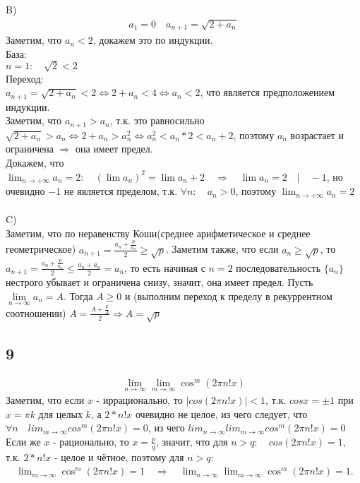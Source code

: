 		\\ \\
		B)\\
		\begin{gather*}
		a_1 = 0 \quad a_{n+1} = \sqrt{2 + a_n}
		\end{gather*}
		Заметим, что $a_n < 2$, докажем это по индукции. \\
		База:\\
		$n = 1: \quad \sqrt{2} < 2$\\ 
		Переход:\\
		$a_{n+1} = \sqrt{2 + a_n} < 2 \Longleftrightarrow 2 + a_n < 4 \Longleftrightarrow a_n < 2$, что является предположением индукции.\\
		Заметим, что $a_{n+1} > a_n$, т.к. это равносильно $\sqrt{2 + a_n} > a_n \Longleftrightarrow 2 + a_n > a_n^2 \Longleftrightarrow a_n^2 < a_n*2 < a_n + 2$, поэтому $a_n$ возрастает и ограничена $\Longrightarrow$ она имеет предел. \\
		Докажем, что $\lim_{n\to+\infty} a_n = 2: \quad (\lim a_n)^2= \lim a_n + 2 \quad \Longrightarrow \quad \lim a_n = 2 \quad|\quad -1$, но очевидно $-1$ не является пределом, т.к. $\forall n:\quad a_n > 0$, поэтому $\lim_{n\to+\infty} a_n = 2$
		\\ \\
		C)\\
		Заметим, что по неравенству Коши(среднее арифметическое и среднее геометрическое) $a_{n+1} = \frac{a_{n} + \frac{p}{a_{n}}}{2} \geqslant \sqrt{p}$. Заметим также, что если $a_{n} \geqslant \sqrt{p}$, то $a_{n+1} = \frac{a_n + \frac{p}{a_n}}{2} \leqslant \frac{a_n + a_n}{2} = a_n $, то есть начиная с $n=2$ последовательность $\{a_n\}$ нестрого убывает и ограничена снизу, значит, она имеет предел. Пусть $\lim\limits_{n \rightarrow \infty} a_n = A $. Тогда $A \geqslant 0$ и (выполним переход к пределу в рекуррентном соотношении) $A = \frac{A + \frac{p}{A}}{2} \Rightarrow A = \sqrt{p}$
		\\
		\subsection{9}
		\begin{gather*}
		\lim_{n \to \infty}\lim_{m \to \infty} \cos^m(2 \pi n ! x)
		\end{gather*}
		Заметим, что если $x$ - иррационально, то $|cos(2\pi n!x)| < 1$, т.к. $cos x = \pm 1$ при $x = \pi k$ для целых $k$, а $2 * n!x$ очевидно не целое, из чего следует, что $\forall n \quad lim_{m \to \infty} cos^m(2\pi n!x) = 0 $, из чего $lim_{n \to \infty} lim_{m \to \infty} cos^m(2\pi n!x) = 0$\\
		Если же $x$ - рационально, то $x = \frac{p}{q}$, значит, что для $n > q: \quad cos(2\pi n!x) = 1$, т.к. $2 * n! x$ - целое и чётное, поэтому для $n > q$: \\
		$\quad \lim_{m \to \infty} \cos^m(2\pi n!x) = 1 \quad \Longrightarrow \quad \lim_{n \to \infty} \lim_{m \to \infty} \cos^m(2\pi n!x) = 1$.\\